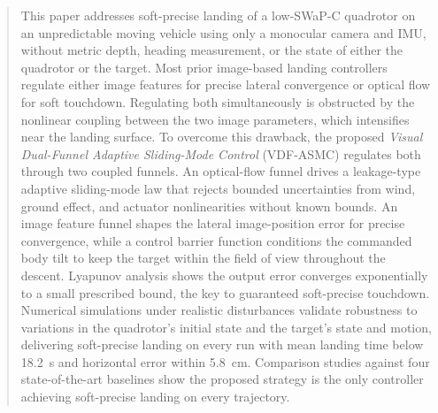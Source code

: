 \documentclass{IEEEtaes}
\begin{document}
\begin{abstract}This paper addresses soft-precise landing of a low-SWaP-C quadrotor on an unpredictable moving vehicle using only a monocular camera and IMU, without metric depth, heading measurement, or the state of either the quadrotor or the target. Most prior image-based landing controllers regulate either image features for precise lateral convergence or optical flow for soft touchdown. Regulating both simultaneously is obstructed by the nonlinear coupling between the two image parameters, which intensifies near the landing surface. To overcome this drawback, the proposed \emph{Visual Dual-Funnel Adaptive Sliding-Mode Control} (VDF-ASMC) regulates both through two coupled funnels. An optical-flow funnel drives a leakage-type adaptive sliding-mode law that rejects bounded uncertainties from wind, ground effect, and actuator nonlinearities without known bounds. An image feature funnel shapes the lateral image-position error for precise convergence, while a control barrier function conditions the commanded body tilt to keep the target within the field of view throughout the descent. Lyapunov analysis shows the output error converges exponentially to a small prescribed bound, the key to guaranteed soft-precise touchdown. Numerical simulations under realistic disturbances validate robustness to variations in the quadrotor's initial state and the target's state and motion, delivering soft-precise landing on every run with mean landing time below 18.2~s and horizontal error within 5.8~cm. Comparison studies against four state-of-the-art baselines show the proposed strategy is the only controller achieving soft-precise landing on every trajectory.
\end{abstract}

\end{document}

